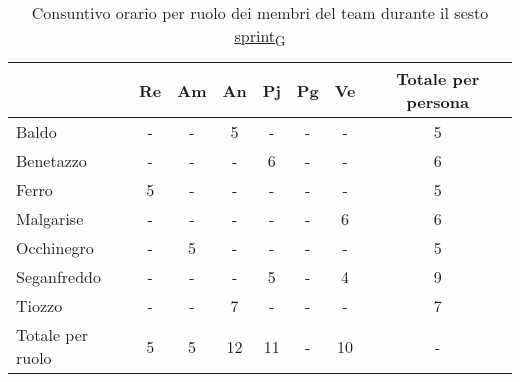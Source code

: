 \begin{table}[!h]
    \centering
    \begin{tabular}{ | l | c | c | c | c | c | c | c | }
        \hline
        \textbf{} & \textbf{Re} & \textbf{Am} &\textbf{An} & \textbf{Pj} & \textbf{Pg} & \textbf{Ve} & \textbf{Totale per persona} \\
        \hline
        Baldo            &  -   &  -   &  5   &  -   &  -   &  -   &  5   \\
        Benetazzo        &  -   &  -   &  -   &  6   &  -   &  -   &  6   \\
        Ferro            &  5   &  -   &  -   &  -   &  -   &  -   &  5   \\
        Malgarise        &  -   &  -   &  -   &  -   &  -   &  6   &  6   \\
        Occhinegro       &  -   &  5   &  -   &  -   &  -   &  -   &  5   \\
        Seganfreddo      &  -   &  -   &  -   &  5   &  -   &  4   &  9   \\
        Tiozzo           &  -   &  -   &  7   &  -   &  -   &  -   &  7   \\
        \hline
        Totale per ruolo &  5   &  5   &  12   &  11   &  -   &  10   &  -   \\
        \hline
    \end{tabular}
    \caption{Consuntivo orario per ruolo dei membri del team durante il sesto \href{https://7last.github.io/docs/pb/documentazione-interna/glossario\#sprint}{sprint\textsubscript{G}}} 
\end{table}

